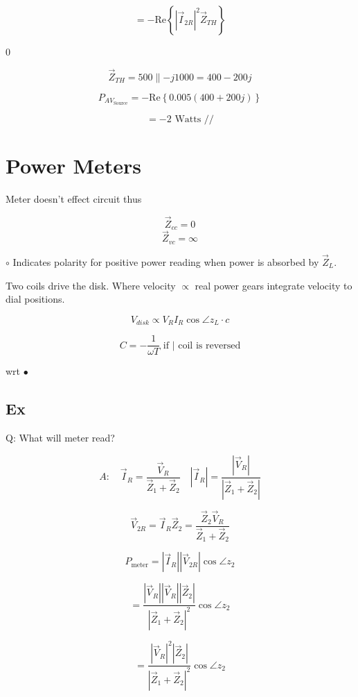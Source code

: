 \[
= -\text{Re}\left\{ |\vec{I}_{2R}|^2 \vec{Z}_{TH} \right\}
\]

\hspace{5cm} 0

\[
\vec{Z}_{TH} = 500 \parallel -j1000 = 400 - 200j
\]

\[
P_{AV_{\text{Source}}} = -\text{Re}\left\{ 0.005(400 + 200j) \right\}
\]

\[
= -2 \text{ Watts } //
\]



\section{Power Meters}


\noindent Meter doesn't effect circuit thus

\[
\vec{Z}_{cc} = 0
\]
\[
\vec{Z}_{vc} = \infty
\]

\noindent $\circ$ Indicates polarity for positive power reading when power is absorbed by $\vec{Z}_L$.

\noindent Two coils drive the disk. Where velocity $\propto$ real power gears integrate velocity to dial positions.

\[
V_{disk} \propto V_R I_R \cos \angle z_L \cdot c
\]

\[
C = -\frac{1}{\omega T} \text{ if } | \text{ coil is reversed}
\]

wrt $\bullet$


\subsection*{Ex}


\noindent Q: What will meter read?

\[
A: \quad \vec{I}_R = \frac{\vec{V}_R}{\vec{Z}_1 + \vec{Z}_2} \quad |\vec{I}_R| = \frac{|\vec{V}_R|}{|\vec{Z}_1 + \vec{Z}_2|}
\]

\[
\vec{V}_{2R} = \vec{I}_R \vec{Z}_2 = \frac{\vec{Z}_2 \vec{V}_R}{\vec{Z}_1 + \vec{Z}_2}
\]

\[
P_{\text{meter}} = |\vec{I}_R| |\vec{V}_{2R}| \cos \angle z_2
\]

\[
= \frac{|\vec{V}_R| |\vec{V}_R| |\vec{Z}_2|}{|\vec{Z}_1 + \vec{Z}_2|^2} \cos \angle z_2
\]

\[
= \frac{|\vec{V}_R|^2 |\vec{Z}_2|}{|\vec{Z}_1 + \vec{Z}_2|^2} \cos \angle z_2
\]
